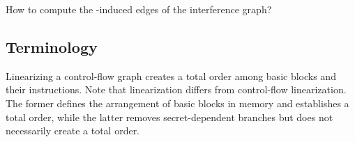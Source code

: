 \documentclass[12pt]{article}
\begin{document}
How to compute the \AMi-induced edges of the interference graph?

\subsection{Terminology}

Linearizing a control-flow graph creates a total order among basic blocks and their instructions. Note that linearization differs from control-flow linearization. The former defines the arrangement of basic blocks in memory and establishes a total order, while the latter removes secret-dependent branches but does not necessarily create a total order.



%
\end{document}
